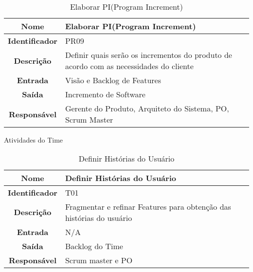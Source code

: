 {              \begin{table}[H]
                \centering
                \caption{Elaborar PI(Program Increment)}
                \begin{tabular}{c|p{10cm}}
                    \hline
                    \textbf{Nome}            & Elaborar PI(Program Increment)\\
                    \hline
                    \textbf{Identificador} & PR09\\ 
                    \hline
                    \textbf{Descrição}   & Definir quais serão os incrementos do produto de acordo com as necessidades do cliente\\ 
                    \hline
                    \textbf{Entrada}           & Visão e Backlog de Features\\
                    \hline
                    \textbf{Saída}            &  Incremento de Software\\
                    \hline
                    \textbf{Responsável}            & Gerente do Produto, Arquiteto do Sistema, PO, Scrum Master\\
                    \hline                    
                \end{tabular}
            \end{table}

     \large{Atividades do Time\\}        

              \begin{table}[H]
                \centering
                \caption{Definir Histórias do Usuário}
                \begin{tabular}{c|p{10cm}}
                    \hline
                    \textbf{Nome}            & Definir Histórias do Usuário\\
                    \hline
                    \textbf{Identificador} & T01\\ 
                    \hline
                    \textbf{Descrição}   & Fragmentar e refinar Features para obtenção das histórias do usuário
\\ 
                    \hline
                    \textbf{Entrada}           & N/A\\
                    \hline
                    \textbf{Saída}            &  Backlog do Time\\
                    \hline
                    \textbf{Responsável}            & Scrum master  e  PO\\
                    \hline                    
                \end{tabular}
            \end{table}

}
